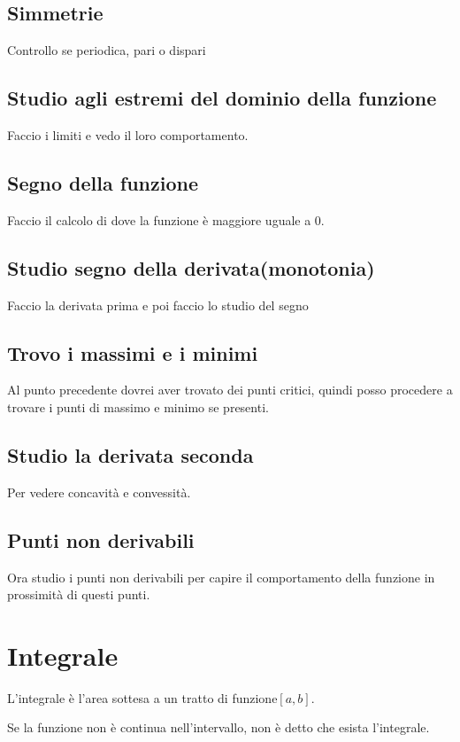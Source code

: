 \documentclass{article}
\begin{document}
    \subsection{Simmetrie}
    Controllo se periodica, pari o dispari

    \subsection{Studio agli estremi del dominio della funzione}
    Faccio i limiti e vedo il loro comportamento.

    \subsection{Segno della funzione}
    Faccio il calcolo di dove la funzione è maggiore uguale a 0.

    \subsection{Studio segno della derivata(monotonia)}
    Faccio la derivata prima e poi faccio lo studio del segno

    \subsection{Trovo i massimi e i minimi}
    Al punto precedente dovrei aver trovato dei punti critici, quindi posso procedere a trovare i punti di massimo e minimo se presenti.

    \subsection{Studio la derivata seconda}
    Per vedere concavità e convessità.

    \subsection{Punti non derivabili}
    Ora studio i punti non derivabili per capire il comportamento della funzione in prossimità di questi punti.


    \section{Integrale}
    L'integrale è l'area sottesa a un tratto di funzione$[a, b]$.
    
    Se la funzione non è continua nell'intervallo, non è detto che esista l'integrale.
\end{document}

